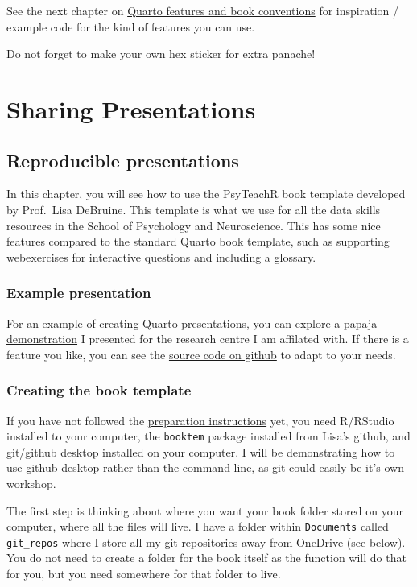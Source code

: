 \documentclass[
  letterpaper,
  DIV=11,
  numbers=noendperiod]{scrreprt}
\begin{document}
See the next chapter on \hyperref[quarto_features]{Quarto features and
book conventions} for inspiration / example code for the kind of
features you can use.

Do not forget to make your own hex sticker for extra panache!

\part{Sharing Presentations}

\chapter{Reproducible presentations}\label{quarto_presentations}

In this chapter, you will see how to use the PsyTeachR book template
developed by Prof.~Lisa DeBruine. This template is what we use for all
the data skills resources in the School of Psychology and Neuroscience.
This has some nice features compared to the standard Quarto book
template, such as supporting webexercises for interactive questions and
including a glossary.

\section{Example presentation}\label{example-presentation}

For an example of creating Quarto presentations, you can explore a
\href{https://github.com/BartlettJE/papaja_demo}{papaja demonstration} I
presented for the research centre I am affilated with. If there is a
feature you like, you can see the
\href{https://github.com/BartlettJE/papaja_demo}{source code on github}
to adapt to your needs.

\section{Creating the book template}\label{creating-the-book-template-1}

If you have not followed the \hyperref[workshop_prep]{preparation
instructions} yet, you need R/RStudio installed to your computer, the
\texttt{booktem} package installed from Lisa's github, and git/github
desktop installed on your computer. I will be demonstrating how to use
github desktop rather than the command line, as git could easily be it's
own workshop.

The first step is thinking about where you want your book folder stored
on your computer, where all the files will live. I have a folder within
\texttt{Documents} called \texttt{git\_repos} where I store all my git
repositories away from OneDrive (see below). You do not need to create a
folder for the book itself as the function will do that for you, but you
need somewhere for that folder to live.
\end{document}
